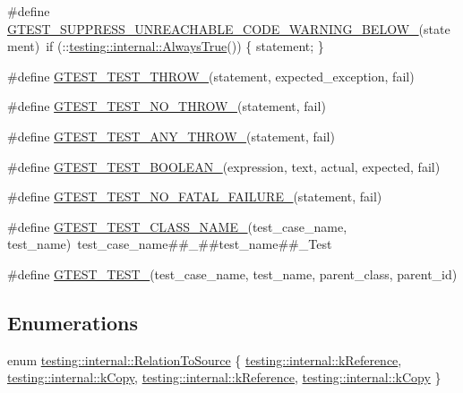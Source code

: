 \begin{DoxyCompactItemize}
\item 
\#define \hyperlink{gtest-internal_8h_a2e66f7dfc5cb87e0fa0289f653173c69}{G\-T\-E\-S\-T\-\_\-\-S\-U\-P\-P\-R\-E\-S\-S\-\_\-\-U\-N\-R\-E\-A\-C\-H\-A\-B\-L\-E\-\_\-\-C\-O\-D\-E\-\_\-\-W\-A\-R\-N\-I\-N\-G\-\_\-\-B\-E\-L\-O\-W\-\_\-}(statement)~if (\-::\hyperlink{namespacetesting_1_1internal_a922c9da63cd4bf94fc473b9ecac76414}{testing\-::internal\-::\-Always\-True}()) \{ statement; \}
\item 
\#define \hyperlink{gtest-internal_8h_a3f71db93eaf30b0cfca9612b9ac32106}{G\-T\-E\-S\-T\-\_\-\-T\-E\-S\-T\-\_\-\-T\-H\-R\-O\-W\-\_\-}(statement, expected\-\_\-exception, fail)
\item 
\#define \hyperlink{gtest-internal_8h_a9a109d026b5a904646437d7570e13581}{G\-T\-E\-S\-T\-\_\-\-T\-E\-S\-T\-\_\-\-N\-O\-\_\-\-T\-H\-R\-O\-W\-\_\-}(statement, fail)
\item 
\#define \hyperlink{gtest-internal_8h_af48bbd26d54d4afc5e4cef39b1c76ba3}{G\-T\-E\-S\-T\-\_\-\-T\-E\-S\-T\-\_\-\-A\-N\-Y\-\_\-\-T\-H\-R\-O\-W\-\_\-}(statement, fail)
\item 
\#define \hyperlink{gtest-internal_8h_ae8912365e1d00a7a2bd248268c64aa1a}{G\-T\-E\-S\-T\-\_\-\-T\-E\-S\-T\-\_\-\-B\-O\-O\-L\-E\-A\-N\-\_\-}(expression, text, actual, expected, fail)
\item 
\#define \hyperlink{gtest-internal_8h_a1b37a3c446836d33040f3266a6236081}{G\-T\-E\-S\-T\-\_\-\-T\-E\-S\-T\-\_\-\-N\-O\-\_\-\-F\-A\-T\-A\-L\-\_\-\-F\-A\-I\-L\-U\-R\-E\-\_\-}(statement, fail)
\item 
\#define \hyperlink{gtest-internal_8h_a87a1ee3a3b9b798195236d053f2e5dcc}{G\-T\-E\-S\-T\-\_\-\-T\-E\-S\-T\-\_\-\-C\-L\-A\-S\-S\-\_\-\-N\-A\-M\-E\-\_\-}(test\-\_\-case\-\_\-name, test\-\_\-name)~test\-\_\-case\-\_\-name\#\#\-\_\-\#\#test\-\_\-name\#\#\-\_\-\-Test
\item 
\#define \hyperlink{gtest-internal_8h_ae2d26f0f92fbaf62bf4c1eca45bb2f1f}{G\-T\-E\-S\-T\-\_\-\-T\-E\-S\-T\-\_\-}(test\-\_\-case\-\_\-name, test\-\_\-name, parent\-\_\-class, parent\-\_\-id)
\end{DoxyCompactItemize}
\subsection*{Enumerations}
\begin{DoxyCompactItemize}
\item 
enum \hyperlink{namespacetesting_1_1internal_aec4f0eeb60b6b8af8dcf979578bbf3bb}{testing\-::internal\-::\-Relation\-To\-Source} \{ \hyperlink{namespacetesting_1_1internal_aec4f0eeb60b6b8af8dcf979578bbf3bba2e7b032679dff6576dd260b01e8f6baa}{testing\-::internal\-::k\-Reference}, 
\hyperlink{namespacetesting_1_1internal_aec4f0eeb60b6b8af8dcf979578bbf3bbabb3df1d7eb03f12dabecbfc4f81cdcaf}{testing\-::internal\-::k\-Copy}, 
\hyperlink{namespacetesting_1_1internal_aec4f0eeb60b6b8af8dcf979578bbf3bba2e7b032679dff6576dd260b01e8f6baa}{testing\-::internal\-::k\-Reference}, 
\hyperlink{namespacetesting_1_1internal_aec4f0eeb60b6b8af8dcf979578bbf3bbabb3df1d7eb03f12dabecbfc4f81cdcaf}{testing\-::internal\-::k\-Copy}
 \}
\end{DoxyCompactItemize}
